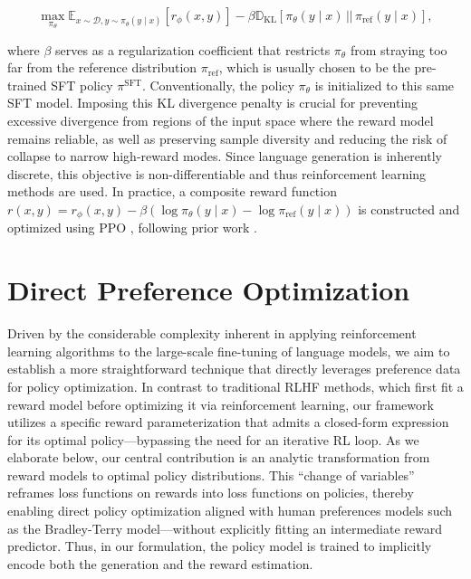 \begin{equation}\label{eq:RL}
\max_{\pi_{\theta}} \mathbb{E}_{x\sim \mathcal{D}, y\sim \pi_{\theta}(y \mid x)}\left[r_{\phi}(x, y)\right] - \beta \mathbb{D}_{\textrm{KL}}\left[\pi_{\theta}(y\mid x)\,||\,\pi_\text{ref}(y\mid x)\right],
\end{equation}

where $\beta$ serves as a regularization coefficient that restricts $\pi_\theta$ from straying too far from the reference distribution $\pi_\text{ref}$, which is usually chosen to be the pre-trained SFT policy $\pi^\text{SFT}$. Conventionally, the policy $\pi_\theta$ is initialized to this same SFT model. Imposing this KL divergence penalty is crucial for preventing excessive divergence from regions of the input space where the reward model remains reliable, as well as preserving sample diversity and reducing the risk of collapse to narrow high-reward modes. Since language generation is inherently discrete, this objective is non-differentiable and thus reinforcement learning methods are used. In practice, a composite reward function ${r(x, y) = r_{\phi}(x, y) -\beta (\log \pi_{\theta}(y\mid x) - \log \pi_\text{ref}(y\mid x))}$ is constructed and optimized using PPO \cite{schulman2017proximal}, following prior work \citep{ziegler2020finetuning, stiennon2022learning, bai2022training, ouyang2022training}.

\section{Direct Preference Optimization}\label{sec:DPO}

Driven by the considerable complexity inherent in applying reinforcement learning algorithms to the large-scale fine-tuning of language models, we aim to establish a more straightforward technique that directly leverages preference data for policy optimization. In contrast to traditional RLHF methods, which first fit a reward model before optimizing it via reinforcement learning, our framework utilizes a specific reward parameterization that admits a closed-form expression for its optimal policy—bypassing the need for an iterative RL loop. As we elaborate below, our central contribution is an analytic transformation from reward models to optimal policy distributions. This “change of variables” reframes loss functions on rewards into loss functions on policies, thereby enabling direct policy optimization aligned with human preferences models such as the Bradley-Terry model—without explicitly fitting an intermediate reward predictor. Thus, in our formulation, the policy model is trained to implicitly encode both the generation and the reward estimation.

